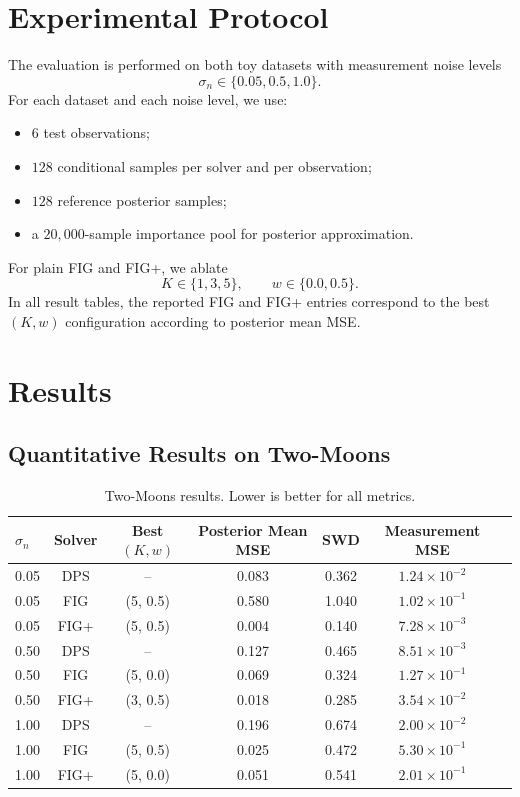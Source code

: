 \documentclass[10pt,twocolumn]{article}
\begin{document}
\section{Experimental Protocol}

The evaluation is performed on both toy datasets with measurement noise levels
\[
\sigma_n \in \{0.05, 0.5, 1.0\}.
\]
For each dataset and each noise level, we use:
\begin{itemize}[leftmargin=1.5em]
    \item \(6\) test observations;
    \item \(128\) conditional samples per solver and per observation;
    \item \(128\) reference posterior samples;
    \item a \(20{,}000\)-sample importance pool for posterior approximation.
\end{itemize}

For plain FIG and FIG+, we ablate
\[
K \in \{1,3,5\},
\qquad
w \in \{0.0, 0.5\}.
\]
In all result tables, the reported FIG and FIG+ entries correspond to the best \((K,w)\) configuration according to posterior mean MSE.

\section{Results}

\subsection{Quantitative Results on Two-Moons}

\begin{table}[t]
\centering
\small
\caption{Two-Moons results. Lower is better for all metrics.}
\begin{tabular}{lcccccc}
\toprule
\(\sigma_n\) & Solver & Best \((K,w)\) & Posterior Mean MSE & SWD & Measurement MSE \\
\midrule
0.05 & DPS & -- & 0.083 & 0.362 & \(1.24\times 10^{-2}\) \\
0.05 & FIG & (5, 0.5) & 0.580 & 1.040 & \(1.02\times 10^{-1}\) \\
0.05 & FIG+ & (5, 0.5) & 0.004 & 0.140 & \(7.28\times 10^{-3}\) \\
\midrule
0.50 & DPS & -- & 0.127 & 0.465 & \(8.51\times 10^{-3}\) \\
0.50 & FIG & (5, 0.0) & 0.069 & 0.324 & \(1.27\times 10^{-1}\) \\
0.50 & FIG+ & (3, 0.5) & 0.018 & 0.285 & \(3.54\times 10^{-2}\) \\
\midrule
1.00 & DPS & -- & 0.196 & 0.674 & \(2.00\times 10^{-2}\) \\
1.00 & FIG & (5, 0.5) & 0.025 & 0.472 & \(5.30\times 10^{-1}\) \\
1.00 & FIG+ & (5, 0.0) & 0.051 & 0.541 & \(2.01\times 10^{-1}\) \\
\bottomrule
\end{tabular}
\label{tab:two_moons}
\end{table}
\end{document}
